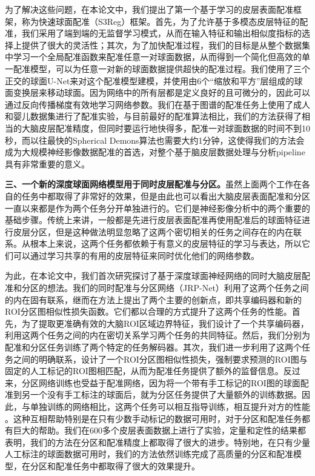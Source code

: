为了解决这些问题，在本论文中，我们提出了第一个基于学习的皮层表面配准框架，称为快速球面配准（S3Reg）框架。首先，为了允许基于多模态皮层特征的配准，我们采用了端到端的无监督学习模式，从而在输入特征和输出相似度指标的选择上提供了很大的灵活性；其次，为了加快配准过程，我们的目标是从整个数据集中学习一个全局配准函数来配准任意一对球面数据，从而得到一个简化但高效的单一配准模型，可以为任意一对新的球面数据提供超快的配准过程。我们使用了三个正交的球面U-Net来对这个配准模型建模，并使用由6个“缩放和平方”层组成的球面变换层来移动球面。因为网络中的所有层都是定义良好的且可微分的，因此可以通过反向传播梯度有效地学习网络参数。我们在基于图谱的配准任务上使用了成人和婴儿数据集进行了配准实验，与目前最好的配准算法相比，我们的方法获得了相当的大脑皮层配准精度，但同时要运行地快得多，配准一对球面数据的时间不到10秒，而以往最快的Spherical Demons算法也需要大约1分钟，这使得我们的方法会成为大规模神经影像数据配准的首选，对整个基于脑皮层数据处理与分析pipeline具有非常重要的意义。

\textbf{三、一个新的深度球面网络模型用于同时皮层配准与分区。}虽然上面两个工作在各自的任务中都取得了非常好的效果，但是由此也可以看出大脑皮层表面配准和分区一直以来都是作为两个任务分开单独进行的。它们是神经影像分析中的两个重要的基础步骤。传统上来讲，一般都是先进行皮层表面配准再使用配准后的球面特征进行皮层分区，但是这种做法明显忽略了这两个密切相关的任务之间存在的内在联系。从根本上来说，这两个任务都依赖于有意义的皮层特征的学习与表达，所以它们可以通过学习共享的有用的皮层特征来同时优化他们的网络参数。

为此，在本论文中，我们首次研究探讨了基于深度球面神经网络的同时大脑皮层配准和分区的想法。我们的同时配准与分区网络（JRP-Net）利用了这两个任务之间的内在固有联系，继而在方法上提出了两个主要的创新点，即共享编码器和新的ROI分区图相似性损失函数。它们都以合理的方式提升了这两个任务的性能。首先，为了提取更准确有效的大脑ROI区域边界特征，我们设计了一个共享编码器，利用这两个任务之间的内在密切关系学习两个任务的共同特征。然后，我们分别为配准和分区任务训练了两个特定的任务解码器。其次，我们进一步利用了这两个任务之间的明确联系，设计了一个ROI分区图相似性损失，强制要求预测的ROI图与固定的人工标记的ROI图相匹配，从而为配准任务提供了额外的监督信息。反过来，分区网络训练也受益于配准网络，因为将一个带有手工标记的ROI图的球面配准到另一个没有手工标注的球面后，就为分区任务提供了大量额外的训练数据。因此，与单独训练的网络相比，这两个任务可以相互指导训练，相互提升对方的性能
。这种互相帮助特别是在只有少数手动标记的数据可用时，对于分区和配准任务都有巨大的帮助。我们在600多个皮层表面数据上进行了实验，定量和定性的结果都表明，我们的方法在分区和配准精度上都取得了很大的进步。特别地，在只有少量人工标注的球面数据可用时，我们的方法依然训练完成了高质量的分区和配准模型，在分区和配准任务中都取得了很大的效果提升。


